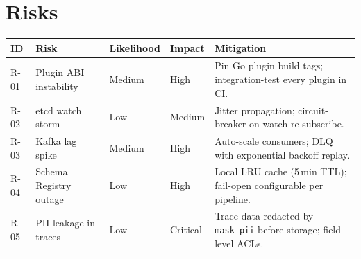 \section{Risks}

\begin{tabularx}{\linewidth}{@{}llllX@{}}
  \toprule
  \textbf{ID} & \textbf{Risk} & \textbf{Likelihood} & \textbf{Impact} & \textbf{Mitigation} \\
  \midrule
  R-01 & Plugin ABI instability   & Medium & High     &
        Pin Go plugin build tags; integration-test every plugin in CI. \\[3pt]
  R-02 & etcd watch storm         & Low    & Medium   &
        Jitter propagation; circuit-breaker on watch re-subscribe. \\[3pt]
  R-03 & Kafka lag spike          & Medium & High     &
        Auto-scale consumers; DLQ with exponential backoff replay. \\[3pt]
  R-04 & Schema Registry outage   & Low    & High     &
        Local LRU cache (5\,min TTL); fail-open configurable per pipeline. \\[3pt]
  R-05 & PII leakage in traces    & Low    & Critical &
        Trace data redacted by \texttt{mask\_pii} before storage; field-level ACLs. \\
  \bottomrule
\end{tabularx}
